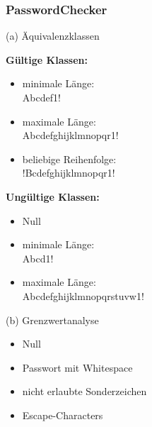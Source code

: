 \subsubsection*{PasswordChecker}
(a) Äquivalenzklassen\\
\begin{minipage}[t]{0.48\textwidth}
\textbf{Gültige Klassen:}
\begin{itemize}
    \item minimale Länge: \\ Abcdef1!
    \item maximale Länge: \\ Abcdefghijklmnopqr1!
    \item beliebige Reihenfolge: \\ !Bcdefghijklmnopqr1!
\end{itemize}
\end{minipage}
\hfill
\begin{minipage}[t]{0.48\textwidth}
\textbf{Ungültige Klassen:}
\begin{itemize}
    \item Null
    \item minimale Länge: \\ Abcd1! 
    \item maximale Länge: \\ Abcdefghijklmnopqrstuvw1! 
\end{itemize}
\end{minipage}

\vspace{1em}

(b) Grenzwertanalyse
\begin{itemize}
    \item Null
    \item Passwort mit Whitespace
    \item nicht erlaubte Sonderzeichen
    \item Escape-Characters 
\end{itemize}

